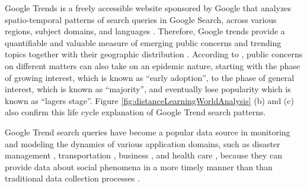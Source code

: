\documentclass[11pt,a4paper,]{article}
\begin{document}
Google Trends is a freely accessible website sponsored by Google that analyzes spatio-temporal patterns of search queries in Google Search, across various regions, subject domains, and languages \autocite{carneiro2009google}. Therefore, Google trends provide a quantifiable and valuable measure of emerging public concerns and trending topics together with their geographic distribution \autocite{alicino2015assessing,cook2011assessing}. According to \textcite{jarynowski2020perception}, public concerns on different matters can also take on an epidemic nature, starting with the phase of growing interest, which is known as ``early adoption'', to the phase of general interest, which is known as ``majority'', and eventually lose popularity which is known as ``lagers stage''. Figure \ref{fig:distanceLearningWorldAnalysis} (b) and (c) also confirm this life cycle explanation of Google Trend search patterns.

Google Trend search queries have become a popular data source in monitoring and modeling the dynamics of various application domains, such as disaster management \autocite{kam2019monitoring}, transportation \autocite{willis2020using}, business \autocite{chumnumpan2019understanding}, and health care \autocite{nuti2014use,alicino2015assessing,arora2019google,carneiro2009google,cook2011assessing}, because they can provide data about social phenomena in a more timely manner than than traditional data collection processes \autocite{vaughan2014web}.
\end{document}
